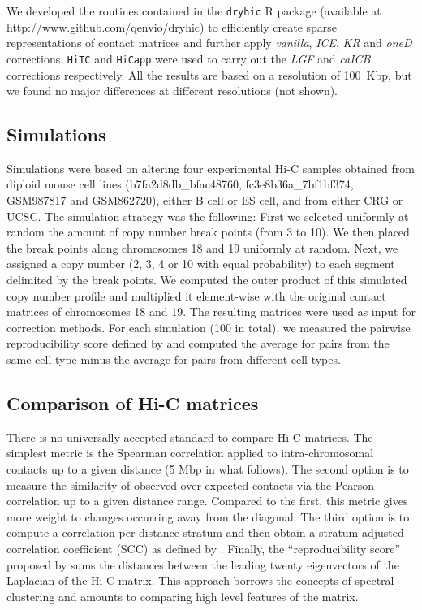\documentclass[a4,center,fleqn]{NAR}
\begin{document}
We developed the routines contained in the \texttt{dryhic} R package
(available at http://www.github.com/qenvio/dryhic) to efficiently create
sparse representations of contact matrices and further apply
\textit{vanilla}, \textit{ICE}, \textit{KR} and \textit{oneD} corrections.
\texttt{HiTC} \citep{servant2012hitc} and \texttt{HiCapp}
\citep{wu2016computational} were used to carry out the \textit{LGF} and
\textit{caICB} corrections respectively. All the results are based on a
resolution of 100~Kbp, but we found no major differences at different
resolutions (not shown).

\subsection{Simulations}


Simulations were based on altering four experimental Hi-C samples obtained
from diploid mouse cell lines (b7fa2d8db\_bfac48760, fc3e8b36a\_7bf1bf374,
GSM987817 and GSM862720), either B cell or ES cell, and from either
CRG or UCSC. The simulation strategy was the following: First we selected
uniformly at random the amount of copy number break points (from 3 to 10).
We then placed the break points along chromosomes 18 and 19 uniformly at
random. Next, we assigned a copy number (2, 3, 4 or 10 with equal
probability) to each segment delimited by the break points. We computed
the outer product of this simulated copy number profile and multiplied it
element-wise with the original contact matrices of chromosomes 18 and 19.
The resulting matrices were used as input for correction methods. For each
simulation (100 in total), we measured the pairwise reproducibility score
defined by \citet{yan2017hicspector} and computed the average for pairs
from the same cell type minus the average for pairs from different cell
types.

\subsection{Comparison of Hi-C matrices}

There is no universally accepted standard to compare Hi-C matrices. The
simplest metric is the Spearman correlation applied to intra-chromosomal
contacts up to a given distance (5 Mbp in what follows). The second option
is to measure the similarity of observed over expected contacts via the
Pearson correlation up to a given distance range. Compared to the first,
this metric gives more weight to changes occurring away from the diagonal.
The third option is to compute a correlation per distance stratum and then
obtain a stratum-adjusted correlation coefficient (SCC) as defined by
\cite{yang2017hicrep}. Finally, the ``reproducibility score'' proposed by
\citet{yan2017hicspector} sums the distances between the leading twenty
eigenvectors of the Laplacian of the Hi-C matrix. This approach borrows
the concepts of spectral clustering \citep{von2007tutorial} and amounts to
comparing high level features of the matrix.
\end{document}
